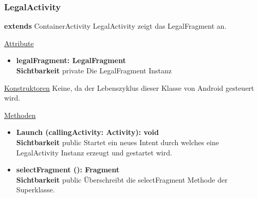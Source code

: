 \subsubsection{LegalActivity}
\textbf{extends} ContainerActivity \newline
LegalActivity zeigt das LegalFragment an.
\newline

\underline{Attribute}
\begin{itemize}
\itemsep0pt
\item \textbf{legalFragment: LegalFragment} \hfill\\ 
\textbf{Sichtbarkeit} private\newline
Die LegalFragment Instanz

\end{itemize}

\underline{Konstruktoren}\newline
\indent Keine, da der Lebenszyklus dieser Klasse von Android gesteuert wird.\newline

\underline{Methoden}
\begin{itemize}
\itemsep0pt

\item \textbf{Launch (callingActivity: Activity): void}\hfill\\
\textbf{Sichtbarkeit} public\newline
Startet ein neues Intent durch welches eine LegalActivity Instanz erzeugt und gestartet wird.

\item \textbf{selectFragment (): Fragment}\hfill\\
\textbf{Sichtbarkeit} public\newline
Überschreibt die selectFragment Methode der Superklasse.

\end{itemize}